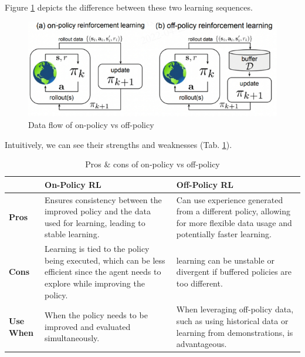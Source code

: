 \documentclass[../main.tex]{subfiles}
\begin{document}
Figure \ref{fig:on_off_policies} depicts the difference between these two learning sequences.
\begin{figure}
    \centering
    \includegraphics[width=1\linewidth]{figures/on_off_policies.png}
    \caption{Data flow of on-policy vs off-policy}
    \label{fig:on_off_policies}
\end{figure}
Intuitively, we can see their strengths and weaknesses (Tab. \ref{tab:on_off_policies}).
\begin{table}[htb]
    \centering
    \caption{Pros \& cons of on-policy vs off-policy}
    \begin{tabular}{l p{6cm} p{6cm}}
        \toprule
        \textbf{ } & \textbf{On-Policy RL} & \textbf{Off-Policy RL} \\
        \midrule
        \addlinespace
        \textbf{Pros} & Ensures consistency between the improved policy and the data used for learning, leading to stable learning. & Can use experience generated from a different policy, allowing for more flexible data usage and potentially faster learning. \\
        \addlinespace
        \textbf{Cons} & Learning is tied to the policy being executed, which can be less efficient since the agent needs to explore while improving the policy. & learning can be unstable or divergent if buffered policies are too different. \\
        \addlinespace
        \textbf{Use When} & When the policy needs to be improved and evaluated simultaneously. & When leveraging off-policy data, such as using historical data or learning from demonstrations, is advantageous. \\
        \bottomrule
    \end{tabular}
\label{tab:on_off_policies}
\end{table}
\end{document}
